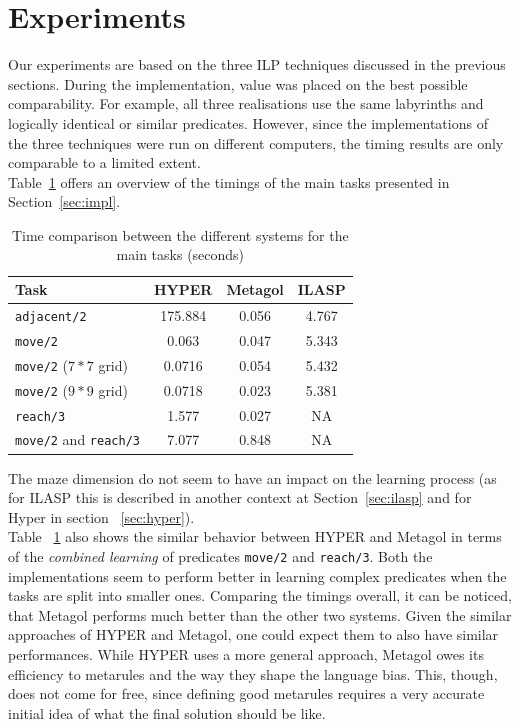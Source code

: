 \newpage
\section{Experiments}\label{sec:exp}
Our experiments are based on the three ILP techniques discussed in the previous sections. 
During the implementation, value was placed on the best possible comparability. For example, all three realisations use the same labyrinths and logically identical or similar predicates.
However, since the implementations of the three techniques were run on different computers, the timing results are only comparable to a limited extent.\\
Table~\ref{tab:prf_cmp} offers an overview of the timings of the main tasks presented in Section~\ref{sec:impl}.
{
\begin{center}
    \begin{table}[h]
    \centering
    \begin{tabular}{ |l|c|c|c| } 
        \hline
        Task & \textbf{HYPER} & \textbf{Metagol} & \textbf{ILASP} \\ \hline
        \texttt{adjacent/2} & 175.884 & 0.056 & 4.767 \\ 
        \texttt{move/2} & 0.063 & 0.047 & 5.343 \\ 
        \texttt{move/2} (\(7*7\) grid) & 0.0716 & 0.054 & 5.432 \\
        \texttt{move/2} (\(9*9\) grid) & 0.0718 & 0.023 & 5.381 \\
        \texttt{reach/3} & 1.577 & 0.027 & NA \\ 
        \texttt{move/2} and \texttt{reach/3} & 7.077 & 0.848 & NA \\ 
        \hline
    \end{tabular}
    \caption{\label{tab:prf_cmp}Time comparison between the different systems for the main tasks (seconds)}
\end{table}
\end{center}
}
The maze dimension do not seem to have an impact on the learning process (as for ILASP this is described
in another context at Section~\ref{sec:ilasp} and for Hyper in section ~\ref{sec:hyper}).\\
Table ~\ref{tab:prf_cmp} also shows the similar behavior between HYPER and Metagol in terms of the \emph{combined
learning} of predicates \texttt{move/2} and \texttt{reach/3}. Both the implementations seem to
perform better in learning complex predicates when the tasks are split into smaller ones.
Comparing the timings overall, it can be noticed, that Metagol performs much better than the other
two systems. Given the similar approaches of HYPER and Metagol, one could expect them
to also have similar performances. While HYPER uses a more general approach, Metagol owes its efficiency to metarules and the way they shape the language bias. This, though, does not come
for free, since defining good metarules requires a very accurate initial idea of what the final solution should be like.\\

